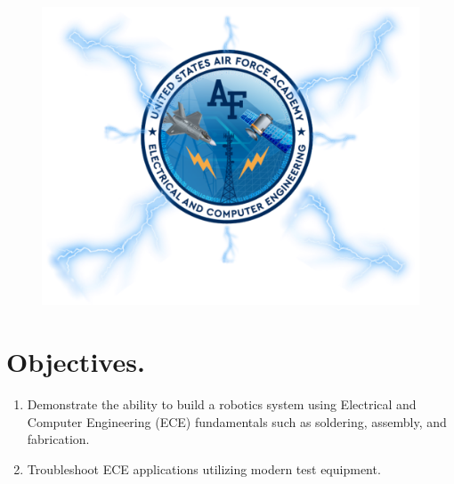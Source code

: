 \documentclass{handout}
\begin{document}
	\maketitle
	
	\begin{figure}[H]
		\centering
		\includegraphics[width=.75\textwidth]{Cover.PNG}
	\end{figure}
	
	\section{Objectives.} 
	\begin{enumerate}
		\item Demonstrate the ability to build a robotics system using Electrical and Computer Engineering (ECE) fundamentals such as soldering, assembly, and fabrication.
		\item Troubleshoot ECE applications utilizing modern test equipment.
	\end{enumerate}
	
\end{document}
